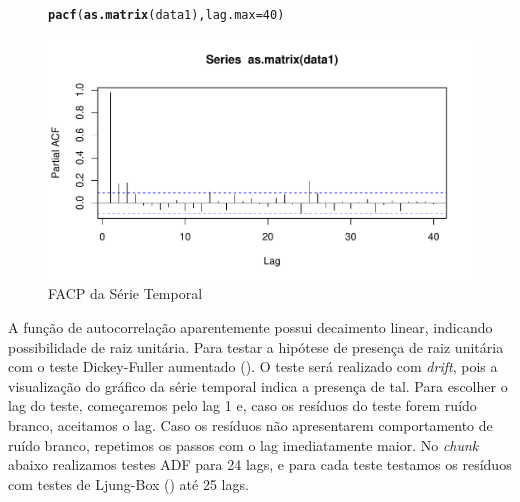 \documentclass{article}\usepackage[]{graphicx}\usepackage[]{color}
\makeatletter
\def\maxwidth{ %
  \ifdim\Gin@nat@width>\linewidth
    \linewidth
  \else
    \Gin@nat@width
  \fi
}
\newcommand{\hlnum}[1]{\textcolor[rgb]{0.686,0.059,0.569}{#1}}%
\newcommand{\hlstd}[1]{\textcolor[rgb]{0.345,0.345,0.345}{#1}}%
\newcommand{\hlkwc}[1]{\textcolor[rgb]{0.333,0.667,0.333}{#1}}%
\newcommand{\hlkwd}[1]{\textcolor[rgb]{0.737,0.353,0.396}{\textbf{#1}}}%
\newenvironment{kframe}{%
 \def\at@end@of@kframe{}%
 \ifinner\ifhmode%
  \def\at@end@of@kframe{\end{minipage}}%
  \begin{minipage}{\columnwidth}%
 \fi\fi%
 \def\FrameCommand##1{\hskip\@totalleftmargin \hskip-\fboxsep
 \colorbox{shadecolor}{##1}\hskip-\fboxsep
     \hskip-\linewidth \hskip-\@totalleftmargin \hskip\columnwidth}%
 \MakeFramed {\advance\hsize-\width
   \@totalleftmargin\z@ \linewidth\hsize
   \@setminipage}}%
 {\par\unskip\endMakeFramed%
 \at@end@of@kframe}
\newenvironment{knitrout}{}{} %
\makeatother
\begin{document}
            \begin{figure}[H]
            \caption{FACP da Série Temporal}
            \centering
\begin{knitrout}
\color{fgcolor}\begin{kframe}
\begin{alltt}
\hlkwd{pacf}\hlstd{(}\hlkwd{as.matrix}\hlstd{(data1),} \hlkwc{lag.max}\hlstd{=}\hlnum{40}\hlstd{)}
\end{alltt}
\end{kframe}
\includegraphics[width=\maxwidth]{figure/unnamed-chunk-30-1} 

\end{knitrout}
            \end{figure}
            
            A função de autocorrelação aparentemente possui decaimento linear, indicando possibilidade de raiz unitária. Para testar a hipótese de presença de raiz unitária com o teste Dickey-Fuller aumentado (\cite{adf}). O teste será realizado com \textit{drift}, pois a visualização do gráfico da série temporal indica a presença de tal. Para escolher o lag do teste, começaremos pelo lag 1 e, caso os resíduos do teste forem ruído branco, aceitamos o lag. Caso os resíduos não apresentarem comportamento de ruído branco, repetimos os passos com o lag imediatamente maior. No \textit{chunk} abaixo realizamos testes ADF para 24 lags, e para cada teste testamos os resíduos com testes de Ljung-Box (\cite{ljungbox}) até 25 lags.
\end{document}
